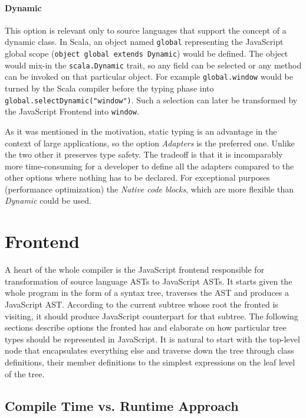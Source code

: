 \documentclass[12pt,a4paper]{report}
\begin{document}
\paragraph{Dynamic} This option is relevant only to source languages that support the concept of a dynamic class. In Scala, an object named \texttt{global} representing the JavaScript global scope (\texttt{object global extends Dynamic}) would be defined. The object  would mix-in the \texttt{scala.Dynamic} \cite{ScalaDynamic} trait, so any field can be selected or any method can be invoked on that particular object. For example \texttt{global.window} would be turned by the Scala compiler before the typing phase into \texttt{global.selectDynamic("window")}. Such a selection can later be transformed by the JavaScript Frontend into \texttt{window}.

As it was mentioned in the motivation, static typing is an advantage in the context of large applications, so the option {\it Adapters} is the preferred one. Unlike the two other it preserves type safety. The tradeoff is that it is incomparably more time-consuming for a developer to define all the adapters compared to the other options where nothing has to be declared. For exceptional purposes (performance optimization) the {\it Native code blocks}, which are more flexible than {\it Dynamic} could be used.

\section{Frontend}

A heart of the whole compiler is the JavaScript frontend responsible for transformation of source language ASTs to JavaScript ASTs. It starts given the whole program in the form of a syntax tree, traverses the AST and produces a JavaScript AST. According to the current subtree whose root the fronted is visiting, it should produce JavaScript counterpart for that subtree. The following sections describe options the fronted has and elaborate on how particular tree types should be represented in JavaScript. It is natural to start with the top-level node that encapsulates everything else and traverse down the tree through class definitions, their member definitions to the simplest expressions on the leaf level of the tree.

\subsection{Compile Time vs. Runtime Approach}
\end{document}
